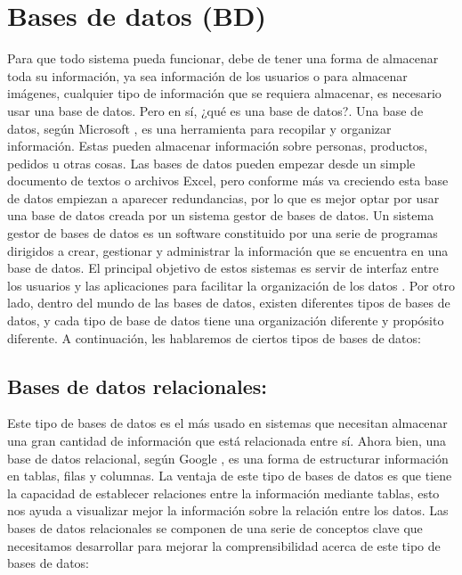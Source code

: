 
\section{Bases de datos (BD)}
Para que todo sistema pueda funcionar, debe de tener una forma de almacenar toda su información, ya sea información de los usuarios o para almacenar imágenes, cualquier tipo de información que se requiera almacenar, es necesario usar una base de datos. Pero en sí, ¿qué es una base de datos?.
Una base de datos, según Microsoft \cite{CitaAJ08} , es una herramienta para recopilar y organizar información. Estas pueden almacenar información sobre personas, productos, pedidos u otras cosas. Las bases de datos pueden empezar desde un simple documento de textos o archivos Excel, pero conforme más va creciendo esta base de datos empiezan a aparecer redundancias, por lo que es mejor optar por usar una base de datos creada por un sistema gestor de bases de datos. 
Un sistema gestor de bases de datos es un software constituido por una serie de programas dirigidos a crear, gestionar y administrar la información que se encuentra en una base de datos. El principal objetivo de estos sistemas es servir de interfaz entre los usuarios y las aplicaciones para facilitar la organización de los datos \cite{CitaAJ06}.
Por otro lado, dentro del mundo de las bases de datos, existen diferentes tipos de bases de datos, y cada tipo de base de datos tiene una organización diferente y propósito diferente. A continuación, les hablaremos de ciertos tipos de bases de datos:

\subsection{Bases de datos relacionales:}
Este tipo de bases de datos es el más usado en sistemas que necesitan almacenar una gran cantidad de información que está relacionada entre sí. Ahora bien, una base de datos relacional, según Google \cite{CitaAJ09}, es una forma de estructurar información en tablas, filas y columnas. La ventaja de este tipo de bases de datos es que tiene la capacidad de establecer relaciones entre la información mediante tablas, esto nos ayuda a visualizar mejor la información sobre la relación entre los datos.
Las bases de datos relacionales se componen de una serie de conceptos clave que necesitamos desarrollar para mejorar la comprensibilidad acerca de este tipo de bases de datos:

